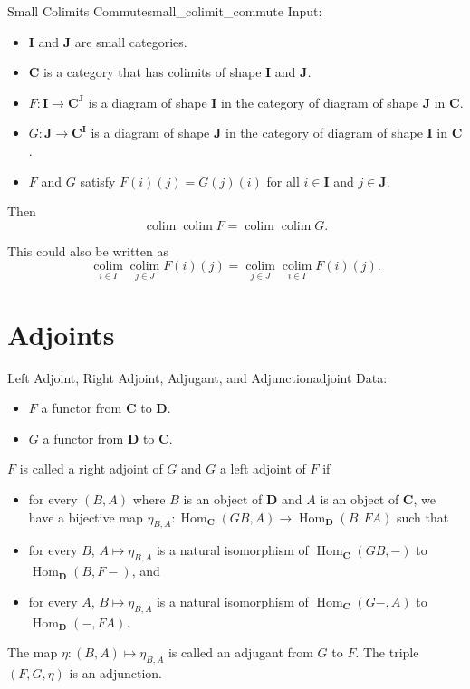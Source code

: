 \documentclass{article}
\begin{document}
\begin{theorem}{Small Colimits Commute}{small_colimit_commute}
    Input:
    \begin{itemize}
        \item $\mathbf{I}$ and $\mathbf{J}$ are small categories.
        \item $\mathbf{C}$ is a category that has colimits of shape $\mathbf{I}$ and $\mathbf{J}$.
        \item $F: \mathbf{I} \rightarrow \mathbf{C}^\mathbf{J}$ is a diagram of shape $\mathbf{I}$ in the category of diagram of shape $\mathbf{J}$ in $\mathbf{C}$.
        \item $G: \mathbf{J} \rightarrow \mathbf{C}^\mathbf{I}$ is a diagram of shape $\mathbf{J}$ in the category of diagram of shape $\mathbf{I}$ in $\mathbf{C}$.
        \item $F$ and $G$ satisfy $F(i)(j) = G(j)(i)$ for all $i\in \mathbf{I}$ and $j\in\mathbf{J}$.
    \end{itemize}
    Then
    \[ \operatorname*{colim} \operatorname*{colim} F = \operatorname*{colim} \operatorname*{colim} G. \]
\end{theorem}
This could also be written as
\[ \operatorname*{colim}_{i\in I} \operatorname*{colim}_{j\in J} F(i)(j) = \operatorname*{colim}_{j\in J} \operatorname*{colim}_{i\in I} F(i)(j). \]

\section{Adjoints}

\begin{definition}{Left Adjoint, Right Adjoint, Adjugant, and Adjunction}{adjoint}
    Data:
    \begin{itemize}
        \item $F$ a functor from $\mathbf{C}$ to $\mathbf{D}$.
        \item $G$ a functor from $\mathbf{D}$ to $\mathbf{C}$.
    \end{itemize}
    $F$ is called a right adjoint of $G$ and $G$ a left adjoint of $F$ if
    \begin{itemize}
        \item for every $(B,A)$ where $B$ is an object of $\mathbf{D}$ and $A$ is an object of $\mathbf{C}$,
        we have a bijective map $\eta_{B,A}: \operatorname{Hom}_{\mathbf{C}}(GB,A) \rightarrow \operatorname{Hom}_{\mathbf{D}}(B,FA)$ such that
        \item for every $B$, $A \mapsto \eta_{B,A}$ is a natural isomorphism of $\operatorname{Hom}_{\mathbf{C}}(GB, -)$ to $\operatorname{Hom}_{\mathbf{D}}(B, F-)$, and
        \item for every $A$, $B \mapsto \eta_{B,A}$ is a natural isomorphism of $\operatorname{Hom}_{\mathbf{C}}(G-, A)$ to $\operatorname{Hom}_{\mathbf{D}}(-, FA)$.
    \end{itemize}
    The map $\eta: (B,A) \mapsto \eta_{B,A}$ is called an adjugant from $G$ to $F$.
    The triple $(F,G,\eta)$ is an adjunction.
\end{definition}
\end{document}
